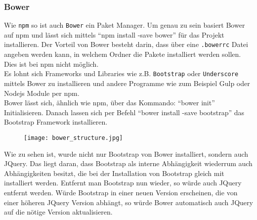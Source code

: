 
		\subsubsection{Bower} %
		\label{ssub:bower}
			Wie \texttt{npm} so ist auch \texttt{Bower} ein Paket Manager. Um genau zu sein basiert Bower auf npm und lässt sich mittels "`npm install -save bower"' für das Projekt installieren. Der Vorteil von Bower besteht darin, dass über eine \texttt{.bowerrc} Datei angeben werden kann, in welchem Ordner die Pakete installiert werden sollen. Dies ist bei npm nicht möglich.\\
			Es lohnt sich Frameworks und Libraries wie z.B. \texttt{Bootstrap} oder \texttt{Underscore} mittels Bower zu installieren und andere Programme wie zum Beispiel Gulp oder Nodejs Module per npm.\\
			Bower lässt sich, ähnlich wie npm, über das Kommando: "`bower init"' Initialisieren. Danach lassen sich per Befehl "`bower install -save bootstrap"' das Bootstrap Framework installieren. 

			\begin{figure}[htbp]
				\begin{center}
					\texttt{[image: bower\_structure.jpg]}
					\label{fig:bower_structure}
				\end{center}
			\end{figure}
			
			Wie zu sehen ist, wurde nicht nur Bootstrap von Bower installiert, sondern auch JQuery. Das liegt daran, dass Bootstrap als interne Abhängigkeit wiederrum auch Abhängigkeiten besitzt, die bei der Installation von Bootstrap gleich mit installiert werden. Entfernt man Bootstrap nun wieder, so würde auch JQuery entfernt werden. Würde Bootstrap in einer neuen Version erscheinen, die von einer höheren JQuery Version abhängt, so würde Bower automatisch auch JQuery auf die nötige Version aktualisieren.
		


